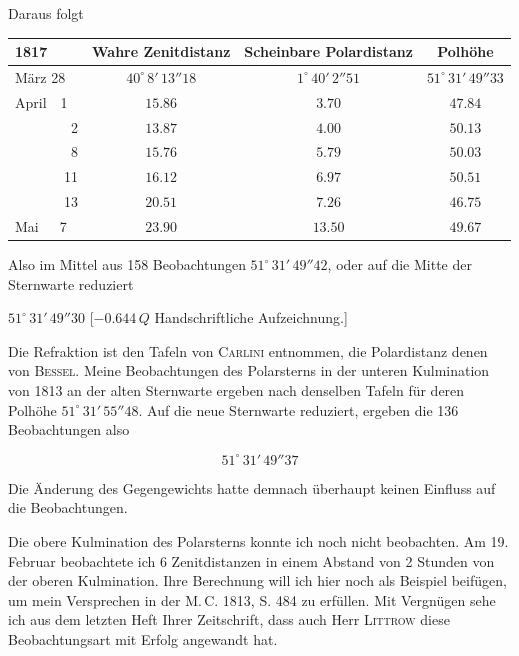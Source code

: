 \par\indent Daraus folgt

\begin{center}
\fontsize{9}{11}\selectfont
\setlength{\tabcolsep}{3pt}
\begin{tabular}{l|c|c|c}
1817 & Wahre Zenitdistanz & Scheinbare Polardistanz & Polhöhe \\
\hline
März 28 & $40^\circ\,8'\,13''18$ & $1^\circ\,40'\,2''51$ & $51^\circ\,31'\,49''33$ \\
April\ \ 1 & $15.86$ & $3.70$ & $47.84$ \\
\ \ \ \ \ \ \ \ 2 & $13.87$ & $4.00$ & $50.13$ \\
\ \ \ \ \ \ \ \ 8 & $15.76$ & $5.79$ & $50.03$ \\
\ \ \ \ \ \ \ 11 & $16.12$ & $6.97$ & $50.51$ \\
\ \ \ \ \ \ \ 13 & $20.51$ & $7.26$ & $46.75$ \\
Mai\ \ \ 7 & $23.90$ & $13.50$ & $49.67$ \\
\end{tabular}
\end{center}

\par\indent Also im Mittel aus 158 Beobachtungen $51^\circ\,31'\,49''42$, oder auf die Mitte der Sternwarte reduziert

\begin{center}\fontsize{10}{12}\selectfont $51^\circ\,31'\,49''30$ [$-0.644\,Q$ Handschriftliche Aufzeichnung.]\end{center}

\par\indent Die Refraktion ist den Tafeln von \textsc{Carlini} entnommen, die Polardistanz denen von \textsc{Bessel}. Meine Beobachtungen des Polarsterns in der unteren Kulmination von 1813 an der alten Sternwarte ergeben nach denselben Tafeln für deren Polhöhe $51^\circ\,31'\,55''48$. Auf die neue Sternwarte reduziert, ergeben die 136 Beobachtungen also

\[ 51^\circ\,31'\,49''37 \]

\par\indent Die Änderung des Gegengewichts hatte demnach überhaupt keinen Einfluss auf die Beobachtungen.

\par\indent Die obere Kulmination des Polarsterns konnte ich noch nicht beobachten. Am 19. Februar beobachtete ich 6 Zenitdistanzen in einem Abstand von 2 Stunden von der oberen Kulmination. Ihre Berechnung will ich hier noch als Beispiel beifügen, um mein Versprechen in der M.\,C. 1813, S. 484 zu erfüllen. Mit Vergnügen sehe ich aus dem letzten Heft Ihrer Zeitschrift, dass auch Herr \textsc{Littrow} diese Beobachtungsart mit Erfolg angewandt hat.


